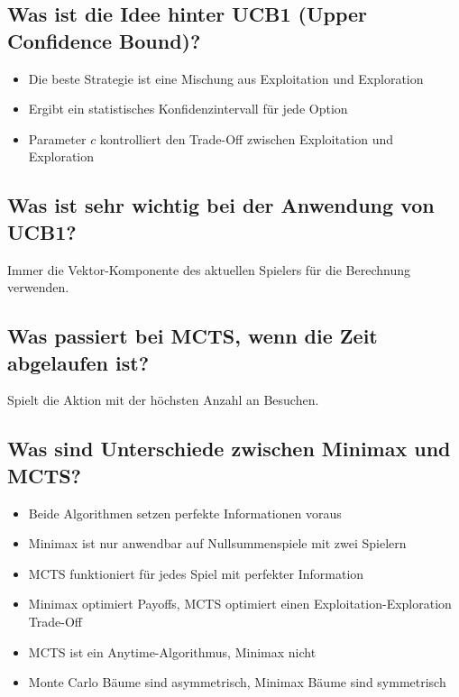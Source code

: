 \documentclass[a4paper]{article}
\begin{document}
		\subsection{Was ist die Idee hinter UCB1 (Upper Confidence Bound)?}
		
		\begin{itemize}
			\item Die beste Strategie ist eine Mischung aus Exploitation und Exploration
			\item Ergibt ein statistisches Konfidenzintervall für jede Option
			\item Parameter $c$ kontrolliert den Trade-Off zwischen Exploitation und Exploration
		\end{itemize}
	
		\subsection{Was ist sehr wichtig bei der Anwendung von UCB1?}
		
		Immer die Vektor-Komponente des aktuellen Spielers für die Berechnung verwenden.
		
		\subsection{Was passiert bei MCTS, wenn die Zeit abgelaufen ist?}
		
		Spielt die Aktion mit der höchsten Anzahl an Besuchen.
		
		\subsection{Was sind Unterschiede zwischen Minimax und MCTS?}
		
		\begin{itemize}
			\item Beide Algorithmen setzen perfekte Informationen voraus
			\item Minimax ist nur anwendbar auf Nullsummenspiele mit zwei Spielern
			\item MCTS funktioniert für jedes Spiel mit perfekter Information
			\item Minimax optimiert Payoffs, MCTS optimiert einen Exploitation-Exploration Trade-Off
			\item MCTS ist ein Anytime-Algorithmus, Minimax nicht
			\item Monte Carlo Bäume sind asymmetrisch, Minimax Bäume sind symmetrisch
		\end{itemize}
		
\end{document}
